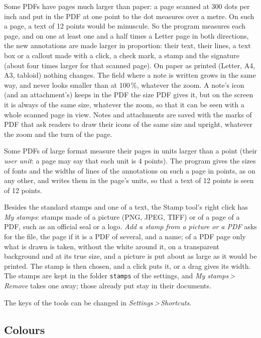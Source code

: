 \documentclass[12pt,
              article,
              oneside
              ]{memoir}
\newcommand*{\menu}[1]{\textit{#1}}
\newcommand*{\then}{\,>\,}
\begin{document}
%
Some PDFs have pages much larger than paper: a page scanned at 300 dots per
inch and put in the PDF at one point to the dot measures over a metre. On
such a page, a text of 12 points would be minuscule. So the program
measures each page, and on one at least one and a half times a Letter page
in both directions, the new annotations are made larger in proportion:
their text, their lines, a text box or a callout made with a click, a
check mark, a stamp and the signature (about four times larger for that
scanned page). On paper as printed (Letter, A4, A3, tabloid) nothing
changes. The field where a note is written grows in the same way, and
never looks smaller than at 100\,\%, whatever the zoom. A note's icon (and an
attachment's) keeps in the PDF the size PDF gives it, but on the screen it is
always of the same size, whatever the zoom, so that it can be seen with a
whole scanned page in view. Notes and attachments are saved with the marks of PDF that ask
readers to draw their icons of the same size and upright, whatever the zoom
and the turn of the page.

%
Some PDFs of large format measure their pages in units larger than a point
(their \emph{user unit}: a page may say that each unit is 4 points). The
program gives the sizes of fonts and the widths of lines of the annotations
on such a page in points, as on any other, and writes them in the page's
units, so that a text of 12 points is seen of 12 points.

%
Besides the standard stamps and one of a text, the Stamp tool's right
click has \menu{My stamps}: stamps made of a picture (PNG, JPEG, TIFF) or
of a page of a PDF, such as an official seal or a logo.
\menu{Add a stamp from a picture or a PDF} asks for the file, the page if
it is a PDF of several, and a name; of a PDF page only what is drawn is
taken, without the white around it, on a transparent background and at
its true size, and a picture is put about as large as it would be printed.
The stamp is then chosen, and a click puts it, or a drag gives its width.
The stamps are kept in the folder \texttt{stamps} of the settings, and
\menu{My stamps\then Remove} takes one away; those already put stay in
their documents.

%
The keys of the tools can be changed in \menu{Settings\then Shortcuts}.

\subsection{Colours}
\end{document}
